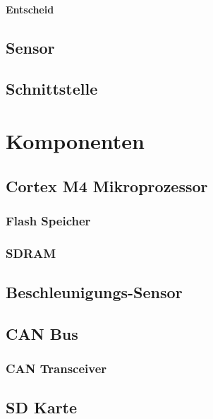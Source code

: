

\paragraph{Entscheid} 

\subsection{Sensor}


\subsection{Schnittstelle}




\section{Komponenten}

\subsection{Cortex M4 Mikroprozessor}

\subsubsection{Flash Speicher}

\subsubsection{SDRAM}


\subsection{Beschleunigungs-Sensor}

\subsection{CAN Bus}

\subsubsection{CAN Transceiver}


\subsection{SD Karte}

